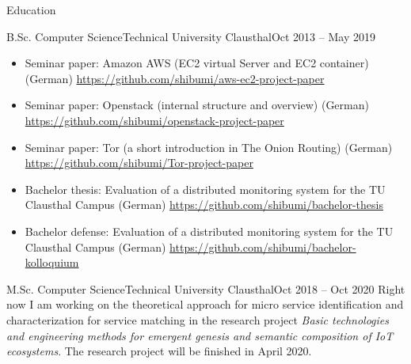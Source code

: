 \documentclass[]{mcdowellcv}
\begin{document}
\begin{cvsection}{Education}
\begin{cvsubsection}{B.Sc. Computer Science}{Technical University Clausthal}{Oct 2013 -- May 2019}
\begin{itemize}
\item Seminar paper: Amazon AWS (EC2 virtual Server and EC2 container) (German) \url{https://github.com/shibumi/aws-ec2-project-paper}
\item Seminar paper: Openstack (internal structure and overview) (German) \url{https://github.com/shibumi/openstack-project-paper}
\item Seminar paper: Tor (a short introduction in The Onion Routing) (German) \url{https://github.com/shibumi/Tor-project-paper}
\item Bachelor thesis: Evaluation of a distributed monitoring system for the TU Clausthal Campus (German) \url{https://github.com/shibumi/bachelor-thesis}
\item Bachelor defense: Evaluation of a distributed monitoring system for the TU Clausthal Campus (German) \url{https://github.com/shibumi/bachelor-kolloquium}
\end{itemize}
\end{cvsubsection}
\begin{cvsubsection}{M.Sc. Computer Science}{Technical University Clausthal}{Oct 2018 -- Oct 2020}
Right now I am working on the theoretical approach for micro service identification and characterization for service matching in the research project \textit{Basic technologies and engineering methods for emergent genesis and semantic composition of IoT ecosystems}. The research project will be finished in April 2020.
\end{cvsubsection}

\end{cvsection}
\end{document}

